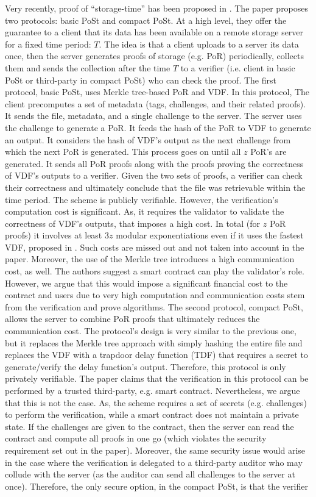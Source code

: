 Very recently, proof of ``storage-time'' has been proposed in \cite{Storage-Time}. The paper proposes two protocols: basic PoSt and compact PoSt. At a high level, they offer the guarantee to a client that its data has been available on a remote storage server for a fixed time period: $T$.  The idea is that a client uploads to a server its data once, then  the server generates proofs of storage (e.g. PoR) periodically, collects them and sends the collection after the time $T$ to a verifier (i.e. client in basic PoSt or third-party in compact PoSt) who can check the proof. The first protocol, basic PoSt, uses Merkle tree-based PoR and VDF. In this protocol, The client precomputes a set of metadata (tags, challenges, and their related proofs). It  sends  the file, metadata, and a single challenge to the server. The server uses the  challenge to generate a PoR. It feeds the hash of the PoR to VDF to generate an output. It considers the hash of VDF's output as the next challenge from which  the next PoR is generated. This process goes on until all $z$ PoR's are generated. It sends all PoR proofs along with the proofs proving the correctness of VDF's outputs to a verifier. Given the two sets of proofs, a verifier can check their correctness and ultimately conclude that the file was retrievable within the time period. The scheme is publicly verifiable. However, the verification's computation cost is significant.  As, it requires  the validator to validate the correctness of VDF's outputs, that imposes a high cost. In total (for $z$ PoR proofs) it involves at least $3z$ modular exponentiations even if it uses  the fastest VDF, proposed in \cite{Wesolowski19}. Such costs are missed out and not taken into account in the paper. Moreover, the use of the Merkle tree introduces a high communication cost, as well. The authors suggest a smart contract can play the validator's role. However, we argue that this would impose a significant financial cost to the contract and users due to very high computation and communication costs stem from the verification and prove algorithms. The second protocol, compact PoSt, allows the server to combine PoR proofs that ultimately reduces the communication cost. The protocol's design is very similar to the previous one, but it replaces the Merkle tree approach with simply hashing the entire file and replaces the VDF with a trapdoor delay function (TDF) that requires a secret to generate/verify the delay function's output. Therefore, this protocol is only privately verifiable. The paper claims that the verification in this protocol can be performed by a trusted third-party, e.g. smart contract. Nevertheless, we argue that this is not the case. As,  the scheme requires a set of secrets (e.g. challenges) to perform the verification, while a smart contract does not maintain a private state. If the challenges are given to the contract, then the server can read the contract and compute all proofs in one go (which violates the security requirement set out in the paper). Moreover, the same security issue would arise in the case where the verification is delegated to a third-party auditor who may collude with the server (as the auditor can send all challenges to the server at once). Therefore, the only secure option, in the compact PoSt, is that  the verifier 